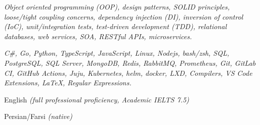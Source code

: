 \documentclass[9pt,a4paper]{extarticle}
\begin{document}
\begin{customitemize}
    \item {}
    \begin{customitemize}
        \item[] {\textit{Object oriented programming (OOP), design patterns, SOLID principles,
                        loose/tight coupling concerns, dependency injection (DI), inversion of
                        control (IoC), unit/integration tests, test-driven development (TDD),
                        relational databases, web services, SOA, RESTful APIs, microservices.
                    }}
    \end{customitemize}
    \item {}
    \begin{customitemize}
        \item[] {
                    \textit{C\#,
                        Go,
                        Python,
                        TypeScript,
                        JavaScript,
                        Linux,
                        Nodejs,
                        bash/zsh,
                        SQL,
                        PostgreSQL,
                        SQL Server,
                        MongoDB,
                        Redis,
                        RabbitMQ,
                        Prometheus,
                        Git,
                        GitLab CI,
                        GitHub Actions,
                        Juju,
                        Kubernetes,
                        helm,
                        docker,
                        LXD,
                        Compilers,
                        VS Code Extensions,
                        \LaTeX,
                        Regular Expressions.}
              }
    \end{customitemize}
    \item {}
    \begin{customitemize}
        \item {English \textit{(full professional proficiency, Academic IELTS 7.5)}}
        \item {Persian/Farsi \textit{(native)}}
    \end{customitemize}
\end{customitemize}
\sectionrule{}
\end{document}
